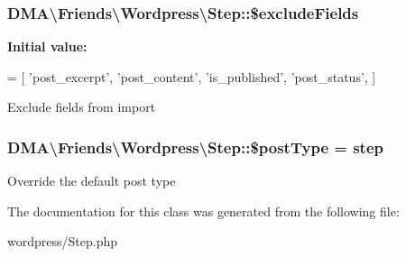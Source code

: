 \subsubsection[{\$exclude\+Fields}]{\setlength{\rightskip}{0pt plus 5cm}D\+M\+A\textbackslash{}\+Friends\textbackslash{}\+Wordpress\textbackslash{}\+Step\+::\$exclude\+Fields\hspace{0.3cm}{\ttfamily [protected]}}\label{classDMA_1_1Friends_1_1Wordpress_1_1Step_aa320e2b0f3f4a24c3cea41e133fd1145}
{\bfseries Initial value\+:}
\begin{DoxyCode}
= [ 
        \textcolor{stringliteral}{'post\_excerpt'},
        \textcolor{stringliteral}{'post\_content'},
        \textcolor{stringliteral}{'is\_published'},
        \textcolor{stringliteral}{'post\_status'},
    ]
\end{DoxyCode}
Exclude fields from import \hypertarget{classDMA_1_1Friends_1_1Wordpress_1_1Step_abaa142e178d837a810e5048af7f36497}{}
\subsubsection[{\$post\+Type}]{\setlength{\rightskip}{0pt plus 5cm}D\+M\+A\textbackslash{}\+Friends\textbackslash{}\+Wordpress\textbackslash{}\+Step\+::\$post\+Type = \textquotesingle{}step\textquotesingle{}}\label{classDMA_1_1Friends_1_1Wordpress_1_1Step_abaa142e178d837a810e5048af7f36497}
Override the default post type 

The documentation for this class was generated from the following file\+:\begin{DoxyCompactItemize}
\item 
wordpress/Step.\+php\end{DoxyCompactItemize}
